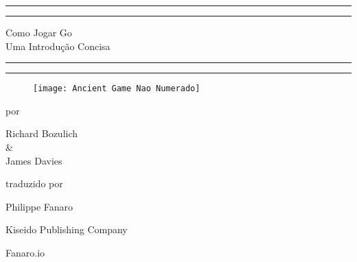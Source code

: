 \begin{titlepage}
    \centering
    
    \scshape

    \vspace*{-1.5cm}
    
    
    \rule{\textwidth}{1.6pt}\vspace*{-\baselineskip}\vspace*{2pt}
    \rule{\textwidth}{0.4pt}
    
    \vspace{0.7\baselineskip}
    
    \Huge{Como Jogar Go}\\
    \vspace*{10pt}
    \LARGE{Uma Introdução Concisa}
    
    \vspace{0.275\baselineskip}
    
    \rule{\textwidth}{0.4pt}\vspace*{-\baselineskip}\vspace{3.2pt}
    \rule{\textwidth}{1.6pt}

    
    \vspace*{.4cm}

    \begin{figure}[h]
        \centering
        \texttt{[image: Ancient Game Nao Numerado]}
    \end{figure}

    
    \vspace*{0.2cm}

    \large{por}

    \vspace*{0.125cm}

    \Large{Richard Bozulich}\\
    \normalsize{\&}\\
    \Large{James Davies}

    
    \vfill

    \large{traduzido por}

    \vspace*{0.125cm}

    \Large{Philippe Fanaro}
    

    \vfill
    
    \large{Kiseido Publishing Company}

    \vspace*{0.25cm}
    
    \large{Fanaro.io}
\end{titlepage}